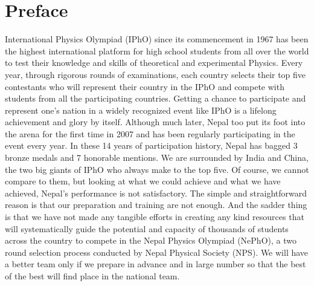\chapter*{Preface}

\hspace{1cm} International Physics Olympiad (IPhO) since its commencement in 1967 has been the highest international platform for high school students from all over the world to test their knowledge and skills of theoretical and experimental Physics. Every year, through rigorous rounds of examinations, each country selects their top five contestants who will represent their country in the IPhO and compete with students from all the participating countries. Getting a chance to participate and represent one’s nation in a widely recognized event like IPhO is a lifelong achievement and glory by itself. Although much later, Nepal too put its foot into the arena for the first time in 2007 and has been regularly participating in the event every year. In these 14 years of participation history, Nepal has bagged 3 bronze medals and 7 honorable mentions. We are surrounded by India and China, the two big giants of IPhO who always make to the top five. Of course, we cannot compare to them, but looking at what we could achieve and what we have achieved, Nepal’s performance is not satisfactory. The simple and straightforward reason is that our preparation and training are not enough. And the sadder thing is that we have not made any tangible efforts in creating any kind resources that will systematically guide the potential and capacity of thousands of students across the country to compete in the Nepal Physics Olympiad (NePhO), a two round selection process conducted by Nepal Physical Society (NPS). We will have a better team only if we prepare in advance and in large number so that the best of the best will find place in the national team.     \\
 
